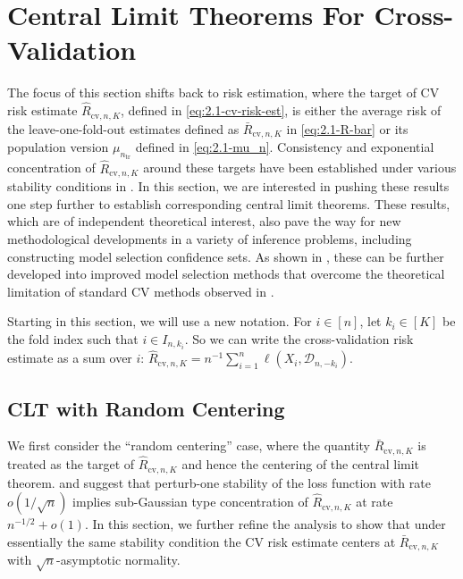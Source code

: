 \documentclass[11pt]{article}
\theoremstyle{plain}
\newcommand{\cv}{{\mathrm{cv}}}
\newcommand{\tr}{{\mathrm{tr}}}
\newcommand{\D}{{\mathcal{D}}}
\begin{document}
\section{Central Limit Theorems For Cross-Validation}\label{sec:4-clt}
The focus of this section shifts back to risk estimation, where the target of CV risk estimate $\hat R_{\cv,n,K}$, defined in \eqref{eq:2.1-cv-risk-est}, is either the average risk of the leave-one-fold-out estimates defined as $\bar R_{\cv,n,K}$ in \eqref{eq:2.1-R-bar} or its population version $\mu_{n_\tr}$ defined in \eqref{eq:2.1-mu_n}.  Consistency and exponential concentration of $\hat R_{\cv,n,K}$ around these targets have been established under various stability conditions in . In this section, we are interested in pushing these results one step further to establish corresponding central limit theorems.  
These results, which are of independent theoretical interest, also pave the way for new methodological developments in a variety of inference problems, including constructing model selection confidence sets. As shown in , these can be further developed into improved model selection methods that overcome the theoretical limitation of standard CV methods observed in .

Starting in this section, we will use a new notation. For $i\in[n]$, let $k_i\in[K]$ be the fold index such that $i\in I_{n,k_i}$.  So we can write the cross-validation risk estimate as a sum over $i$:
$\hat R_{\cv,n,K}=n^{-1}\sum_{i=1}^n \ell(X_i,\D_{n,-k_i})$.

\subsection{CLT with Random Centering}\label{subsec:4.1-clt-random}
We first consider the ``random centering'' case, where the quantity $\bar R_{\cv,n,K}$ is treated as the target of $\hat R_{\cv,n,K}$ and hence the centering of the central limit theorem.  and  suggest that perturb-one stability of the loss function with rate $o(1/\sqrt{n})$ implies sub-Gaussian type concentration of $\hat R_{\cv,n,K}$ at rate $n^{-1/2}+o(1)$. In this section, we further refine the analysis to show that under essentially the same stability condition the CV risk estimate centers at $\bar R_{\cv,n,K}$ with $\sqrt{n}$-asymptotic normality.
\end{document}

